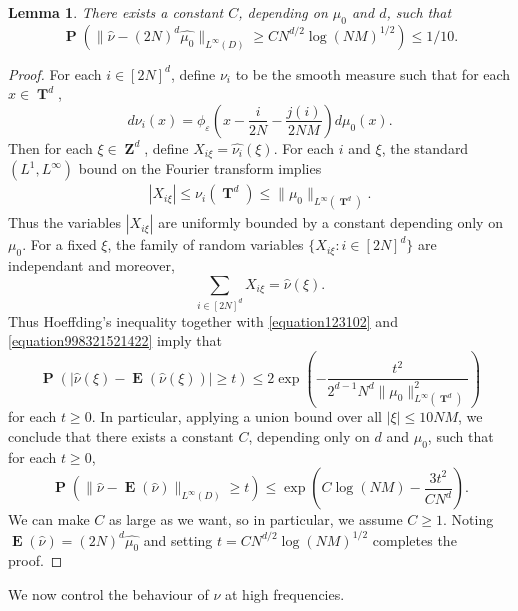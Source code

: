 \documentclass[12pt,reqno]{article}
\DeclareMathOperator{\ZZ}{\mathbf{Z}}
\DeclareMathOperator{\TT}{\mathbf{T}}
\newtheorem{lemma}[theorem]{Lemma}
\DeclareMathOperator{\EE}{\mathbf{E}}
\DeclareMathOperator{\PP}{\mathbf{P}}
\begin{document}
\begin{lemma} \label{lemma532952}
    There exists a constant $C$, depending on $\mu_0$ and $d$, such that
    \[ \PP \left( \| \widehat{\nu} - (2N)^d \widehat{\mu_0} \|_{L^\infty(D)} \geq C N^{d/2} \log(NM)^{1/2} \right) \leq 1/10. \]
\end{lemma}
\begin{proof}
    For each $i \in [2N]^d$, define $\nu_i$ to be the smooth measure such that for each $x \in \TT^d$,
    \[ d\nu_i(x) = \phi_\varepsilon \left( x - \frac{i}{2N} - \frac{j(i)}{2NM} \right) d\mu_0(x). \]
    Then for each $\xi \in \ZZ^d$, define $X_{i \xi} = \widehat{\nu_i}(\xi)$. For each $i$ and $\xi$, the standard $(L^1,L^\infty)$ bound on the Fourier transform implies
    \begin{equation} \label{equation123102}
    \begin{split}
        |X_{i\xi}| \leq \nu_i(\TT^d) \leq \| \mu_0 \|_{L^\infty(\TT^d)}.
    \end{split}
    \end{equation}
    Thus the variables $|X_{i \xi}|$ are uniformly bounded by a constant depending only on $\mu_0$. For a fixed $\xi$, the family of random variables $\{ X_{i \xi} : i \in [2N]^d \}$ are independant and moreover,
    \begin{equation} \label{equation998321521422}
        \sum_{i \in [2N]^d} X_{i \xi} = \widehat{\nu}(\xi).
    \end{equation}
    Thus Hoeffding's inequality together with \eqref{equation123102} and \eqref{equation998321521422} imply that
    \[ \PP \left( \left| \widehat{\nu}(\xi) - \EE(\widehat{\nu}(\xi)) \right| \geq t \right) \leq 2 \exp \left( - \frac{t^2}{2^{d-1} N^{d} \| \mu_0 \|_{L^\infty(\TT^d)}^2} \right) \]
    for each $t \geq 0$. In particular, applying a union bound over all $|\xi| \leq 10 NM$, we conclude that there exists a constant $C$, depending only on $d$ and $\mu_0$, such that for each $t \geq 0$,
    \[ \PP \left( \| \widehat{\nu} - \EE(\widehat{\nu}) \|_{L^\infty(D)} \geq t \right) \leq \exp \left( C \log(NM) - \frac{3 t^2}{C N^d} \right). \]
    We can make $C$ as large as we want, so in particular, we assume $C \geq 1$. Noting $\EE(\widehat{\nu}) = (2N)^d \widehat{\mu_0}$ and setting $t = C N^{d/2} \log(NM)^{1/2}$ completes the proof.
\end{proof}

We now control the behaviour of $\nu$ at high frequencies.
\end{document}
